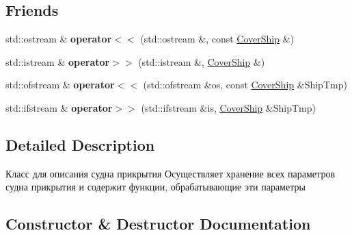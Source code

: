 \subsection*{Friends}
\begin{DoxyCompactItemize}
\item 
\mbox{\label{class_aircraft_carrier_group_1_1_cover_ship_ab8e63b3a622b88cf4f646f4eccc00814}} 
std\+::ostream \& {\bfseries operator$<$$<$} (std\+::ostream \&, const \mbox{\hyperlink{class_aircraft_carrier_group_1_1_cover_ship}{Cover\+Ship}} \&)
\item 
\mbox{\label{class_aircraft_carrier_group_1_1_cover_ship_a7fd7e824e296c6274749d4a513fb2c60}} 
std\+::istream \& {\bfseries operator$>$$>$} (std\+::istream \&, \mbox{\hyperlink{class_aircraft_carrier_group_1_1_cover_ship}{Cover\+Ship}} \&)
\item 
\mbox{\label{class_aircraft_carrier_group_1_1_cover_ship_aad872f064ca5a57c498532eb094736c3}} 
std\+::ofstream \& {\bfseries operator$<$$<$} (std\+::ofstream \&os, const \mbox{\hyperlink{class_aircraft_carrier_group_1_1_cover_ship}{Cover\+Ship}} \&Ship\+Tmp)
\item 
\mbox{\label{class_aircraft_carrier_group_1_1_cover_ship_a5b82b819d3b9c1c4a566a69de13b0f3f}} 
std\+::ifstream \& {\bfseries operator$>$$>$} (std\+::ifstream \&is, \mbox{\hyperlink{class_aircraft_carrier_group_1_1_cover_ship}{Cover\+Ship}} \&Ship\+Tmp)
\end{DoxyCompactItemize}


\subsection{Detailed Description}
Класс для описания судна прикрытия  Осуществляет хранение всех параметров судна прикрытия и содержит функции, обрабатывающие эти параметры 

\subsection{Constructor \& Destructor Documentation}
\mbox{\label{class_aircraft_carrier_group_1_1_cover_ship_a3735bd14678da33bd128266774d21f64}} 
